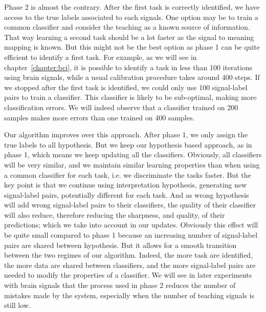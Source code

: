 Phase 2 is almost the contrary. After the first task is correctly identified, we have access to the true labels associated to each signals. One option may be to train a common classifier and consider the teaching as a known source of information. That way learning a second task should be a lot faster as the signal to meaning mapping is known. But this might not be the best option as phase 1 can be quite efficient to identify a first task. For example, as we will see in chapter~\ref{chapter:bci}, it is possible to identify a task in less than 100 iterations using brain signals, while a usual calibration procedure takes around 400 steps. If we stopped after the first task is identified, we could only use 100 signal-label pairs to train a classifier. This classifier is likely to be sub-optimal, making more classification errors. We will indeed observe that a classifier trained on 200 samples makes more errors than one trained on 400 samples.

Our algorithm improves over this approach. After phase 1, we only assign the true labels to all hypothesis. But we keep our hypothesis based approach, as in phase 1, which means we keep updating all the classifiers. Obviously, all classifiers will be very similar, and we maintain similar learning properties than when using a common classifier for each task, i.e. we discriminate the tasks faster. But the key point is that we continue using interpretation hypothesis, generating new signal-label pairs, potentially different for each task. And as wrong hypothesis will add wrong signal-label pairs to their classifiers, the quality of their classifier will also reduce, therefore reducing the sharpness, and quality, of their predictions; which we take into account in our updates. Obviously this effect will be quite small compared to phase 1 because an increasing number of signal-label pairs are shared between hypothesis. But it allows for a smooth transition between the two regimes of our algorithm. Indeed, the more task are identified, the more data are shared between classifiers, and the more signal-label pairs are needed to modify the properties of a classifier. We will see in later experiments with brain signals that the process used in phase 2 reduces the number of mistakes made by the system, especially when the number of teaching signals is still low.


